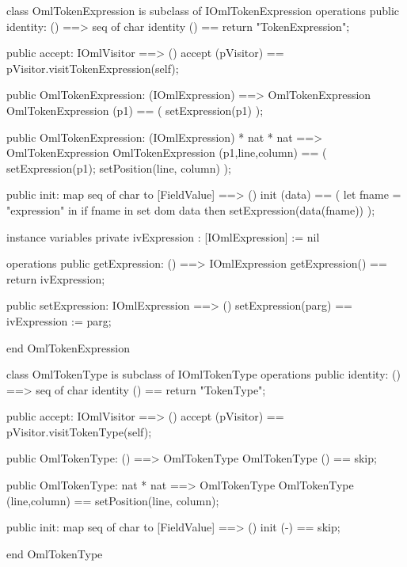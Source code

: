 \begin{vdm_al}
class OmlTokenExpression is subclass of IOmlTokenExpression
operations
  public identity: () ==> seq of char
  identity () == return "TokenExpression";

  public accept: IOmlVisitor ==> ()
  accept (pVisitor) == pVisitor.visitTokenExpression(self);

  public OmlTokenExpression:
    (IOmlExpression) ==> OmlTokenExpression
  OmlTokenExpression (p1) == 
    ( setExpression(p1) );

  public OmlTokenExpression:
    (IOmlExpression) *
    nat *
    nat ==> OmlTokenExpression
  OmlTokenExpression (p1,line,column) == 
    ( setExpression(p1);
      setPosition(line, column) );

  public init: map seq of char to [FieldValue] ==> ()
  init (data) ==
    ( let fname = "expression" in
        if fname in set dom data
        then setExpression(data(fname)) );

instance variables
  private ivExpression : [IOmlExpression] := nil

operations
  public getExpression: () ==> IOmlExpression
  getExpression() == return ivExpression;

  public setExpression: IOmlExpression ==> ()
  setExpression(parg) == ivExpression := parg;

end OmlTokenExpression
\end{vdm_al}

\begin{vdm_al}
class OmlTokenType is subclass of IOmlTokenType
operations
  public identity: () ==> seq of char
  identity () == return "TokenType";

  public accept: IOmlVisitor ==> ()
  accept (pVisitor) == pVisitor.visitTokenType(self);

  public OmlTokenType:
    () ==> OmlTokenType
  OmlTokenType () == 
    skip;

  public OmlTokenType:
    nat *
    nat ==> OmlTokenType
  OmlTokenType (line,column) == 
    setPosition(line, column);

  public init: map seq of char to [FieldValue] ==> ()
  init (-) == skip;

end OmlTokenType
\end{vdm_al}

